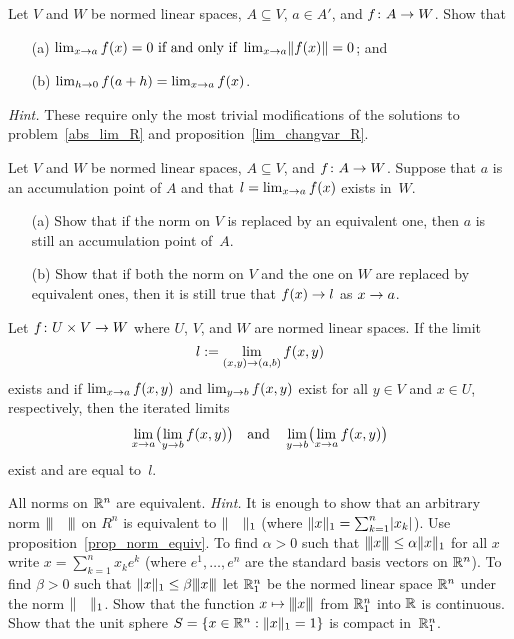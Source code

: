 \begin{prob}  Let $V$ and $W$ be normed linear spaces, $A \subseteq V$, $a \in A'$, and
$f\colon A \rightarrow W$.  Show that
 \begin{enumerate}
  \item[(a)] $\lim_{x \rightarrow a}f(x) = 0 \text{ if and only if } \lim_{x \rightarrow a} \lVert f(x)\rVert = 0$; and
  \item[(b)] $\lim_{h \rightarrow 0}f(a+h) = \lim_{x \rightarrow a}f(x)$.
 \end{enumerate}
\emph{Hint.}  These require only the most trivial modifications of the solutions to
problem~\ref{abs_lim_R} and proposition~\ref{lim_changvar_R}.
\end{prob}

\begin{prob} Let $V$ and $W$ be normed linear spaces, $A \subseteq V$, and $f\colon A \rightarrow W$.
Suppose that $a$ is an accumulation point of $A$ and that $l = \lim_{x \rightarrow a}f(x)$ exists
in~$W$.
 \begin{enumerate}
  \item[(a)]  Show that if the norm on $V$ is replaced by an equivalent one, then $a$ is still
an accumulation point of~$A$.
  \item[(b)]  Show that if both the norm on $V$ and the one on $W$ are replaced by equivalent
ones, then it is still true that $f(x) \rightarrow l$ as $x \rightarrow a$.
 \end{enumerate}
\end{prob}

\begin{prob}  Let $f\colon U \times V \rightarrow W$ where $U$, $V$, and $W$ are normed linear spaces.
If the limit
  \[ l := \lim_{(x,y) \rightarrow (a,b)} f(x,y) \]
exists and if $\lim_{x \rightarrow a}f(x,y)$ and $\lim_{y \rightarrow b}f(x,y)$ exist for all $y \in V$ and
$x \in U$, respectively, then the iterated limits
  \[ \lim_{x \rightarrow a}\bigl(\lim_{y \rightarrow b} f(x,y)\bigr) \quad \text{and}
                  \quad \lim_{y \rightarrow b}\bigl(\lim_{x \rightarrow a} f(x,y)\bigr) \]
exist and are equal to~$l$.
\end{prob}

\begin{prob}\label{prob_norms_Rn}  All norms on $\mathbb{R}^n$ are equivalent.  \emph{Hint.}  It is
enough to show that an arbitrary norm $\vert\mspace{-2mu}\vert \mspace{-2mu}\vert\hphantom{00}\vert\mspace{-2mu}\vert \mspace{-2mu}\vert$ on $R^n$ is equivalent to
$\lVert\quad\rVert_1$ (where $\lVert x\rVert_1 = \sum_{k=1}^n \lvert x_k\rvert$). Use
proposition~\ref{prop_norm_equiv}.  To find $\alpha > 0$ such that $\vert\mspace{-2mu}\vert \mspace{-2mu}\vert x\vert\mspace{-2mu}\vert \mspace{-2mu}\vert \le \alpha\lVert x\rVert_1$ for all $x$ write $x = \sum_{k=1}^n x_k e^k$ (where $e^1, \dots, e^n$ are the standard
basis vectors on $\mathbb{R}^n$).  To find $\beta > 0$ such that $\lVert x\rVert_1 \le \beta \vert\mspace{-2mu}\vert \mspace{-2mu}\vert x\vert\mspace{-2mu}\vert \mspace{-2mu}\vert$ let
$\mathbb{R}_1^n$ be the normed linear space $\mathbb{R}^n$ under the norm $\lVert\quad\rVert_1$.  Show that the
function $x \mapsto \vert\mspace{-2mu}\vert \mspace{-2mu}\vert x\vert\mspace{-2mu}\vert \mspace{-2mu}\vert$ from $\mathbb{R}_1^n$ into $\mathbb{R}$ is continuous. Show that the unit
sphere $S = \{x \in \mathbb{R}^n: \lVert x\rVert_1 = 1\}$ is compact in~$\mathbb{R}_1^n$.
\end{prob}











